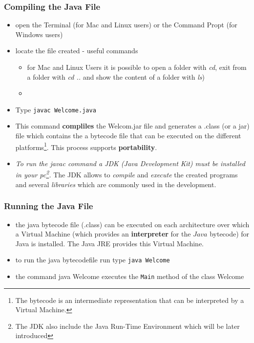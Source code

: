 \documentclass{article}
\theoremstyle{definition}
\begin{document}
\subsubsection{Compiling the Java File}
\begin{itemize}
\item open the Terminal (for Mac and Linux users) or the Command Propt (for Windows users)
\item locate the file created - useful commands 
\begin{itemize}
\item for Mac and Linux Users it is possible to open a folder with \emph{cd}, exit from a folder with \emph{cd ..} and show the content of a folder with \emph{ls}) 
\item
\end{itemize}
\item Type \texttt{javac Welcome.java}
\item This command \textbf{compliles} the Welcom.jar file and generates a .class (or a jar) file which contains the a bytecode file that can be executed on the different platforms\footnote{The bytecode is an intermediate representation that can be interpreted by a Virtual Machine.}. This process supports \textbf{portability}.
\item \emph{To run the javac command a JDK (Java Development Kit) must be installed in your pc\footnote{The JDK also include the Java Run-Time Environment which will be later introduced}.} The JDK allows to \emph{compile} and \emph{execute} the created programs and several \emph{libraries} which are commonly used in the development.
\end{itemize}

\subsubsection{Running the Java File}
\begin{itemize}
\item the java bytecode file (.class) can be executed on each architecture over which a Virtual Machine (which provides an \textbf{interpreter} for the $Java$ bytecode) for Java is installed. The Java JRE provides this Virtual Machine.
\item to run the java bytecodefile run type \texttt{java Welcome}
\item the command java Welcome executes the \texttt{Main} method of the class Welcome
\end{itemize}
\end{document}

